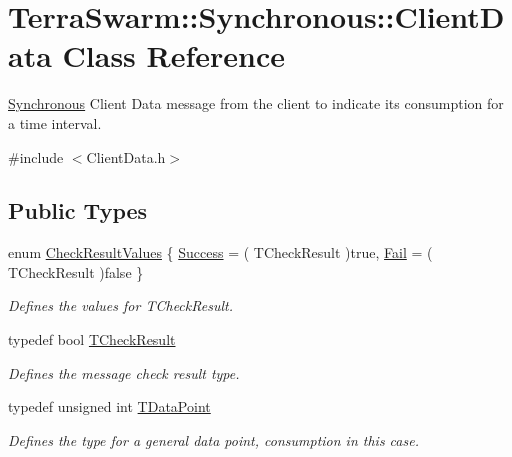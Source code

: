 \hypertarget{class_terra_swarm_1_1_synchronous_1_1_client_data}{\section{Terra\-Swarm\-:\-:Synchronous\-:\-:Client\-Data Class Reference}
\label{class_terra_swarm_1_1_synchronous_1_1_client_data}
}


\hyperlink{namespace_terra_swarm_1_1_synchronous}{Synchronous} Client Data message from the client to indicate its consumption for a time interval.  




{\ttfamily \#include $<$Client\-Data.\-h$>$}

\subsection*{Public Types}
\begin{DoxyCompactItemize}
\item 
enum \hyperlink{class_terra_swarm_1_1_synchronous_1_1_client_data_ab069b9069716e25b2e5be34d2356ec01}{Check\-Result\-Values} \{ \hyperlink{class_terra_swarm_1_1_synchronous_1_1_client_data_ab069b9069716e25b2e5be34d2356ec01a655e724c0fe6463a22105e8c629a345d}{Success} = ( T\-Check\-Result )true, 
\hyperlink{class_terra_swarm_1_1_synchronous_1_1_client_data_ab069b9069716e25b2e5be34d2356ec01a12ebd40706bb9823852ae1688e87e831}{Fail} = ( T\-Check\-Result )false
 \}
\begin{DoxyCompactList}\small\item\em Defines the values for T\-Check\-Result. \end{DoxyCompactList}\item 
typedef bool \hyperlink{class_terra_swarm_1_1_synchronous_1_1_client_data_a2a4af9153f7e8fe6cadba6a188ce2207}{T\-Check\-Result}
\begin{DoxyCompactList}\small\item\em Defines the message check result type. \end{DoxyCompactList}\item 
typedef unsigned int \hyperlink{class_terra_swarm_1_1_synchronous_1_1_client_data_a6c581f1f80217390ea8fe95136c60f07}{T\-Data\-Point}
\begin{DoxyCompactList}\small\item\em Defines the type for a general data point, consumption in this case. \end{DoxyCompactList}\end{DoxyCompactItemize}
